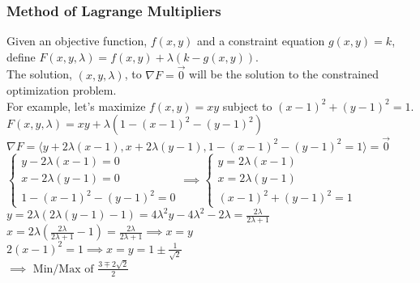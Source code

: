\subsubsection{Method of Lagrange Multipliers}
\noindent
Given an objective function, $f(x,y)$ and a constraint equation $g(x,y)=k$, define $F(x,y,\lambda)=f(x,y)+\lambda(k-g(x,y))$.\\
The solution, $(x,y,\lambda)$, to $\nabla F=\vec{0}$ will be the solution to the constrained optimization problem.\\

\noindent
For example, let's maximize $f(x,y)=xy$ subject to $(x-1)^2+(y-1)^2=1$.\\
\indent
$F(x,y,\lambda)=xy+\lambda(1-(x-1)^2-(y-1)^2)$\\
\indent
$\nabla F=\langle y+2\lambda(x-1),x+2\lambda(y-1),1-(x-1)^2-(y-1)^2=1\rangle=\vec{0}$\\
\indent
$\begin{cases}y-2\lambda(x-1)=0 \\ x-2\lambda(y-1)=0 \\ 1-(x-1)^2-(y-1)^2=0\end{cases}\implies\begin{cases}y=2\lambda(x-1) \\ x=2\lambda(y-1) \\ (x-1)^2+(y-1)^2=1\end{cases}$\\
\indent
$y=2\lambda(2\lambda(y-1)-1)=4\lambda^2y-4\lambda^2-2\lambda=\frac{2\lambda}{2\lambda+1}$\\
\indent
$x=2\lambda\left(\frac{2\lambda}{2\lambda+1}-1\right)=\frac{2\lambda}{2\lambda+1}\implies x=y$\\
\indent
$2(x-1)^2=1\implies x=y=1\pm\frac{1}{\sqrt{2}}$\\
\indent
$\implies\text{ Min/Max of }\frac{3\mp2\sqrt{2}}{2}$\\